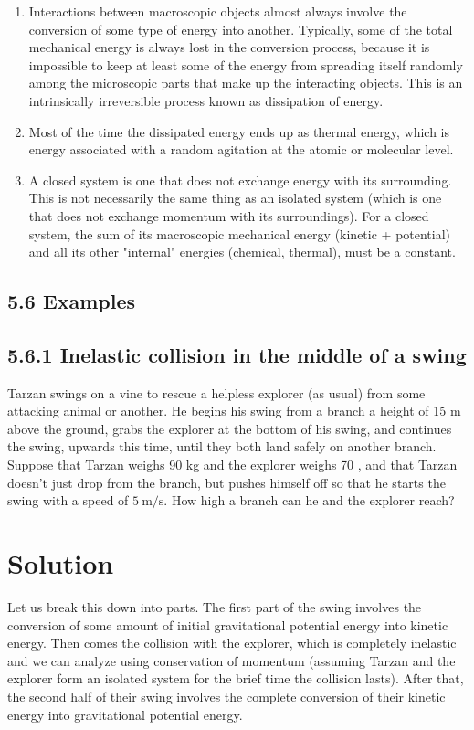 \documentclass[10pt]{article}
\begin{document}
\begin{enumerate}
  \item Interactions between macroscopic objects almost always involve the conversion of some type of energy into another. Typically, some of the total mechanical energy is always lost in the conversion process, because it is impossible to keep at least some of the energy from spreading itself randomly among the microscopic parts that make up the interacting objects. This is an intrinsically irreversible process known as dissipation of energy.
  \item Most of the time the dissipated energy ends up as thermal energy, which is energy associated with a random agitation at the atomic or molecular level.
  \item A closed system is one that does not exchange energy with its surrounding. This is not necessarily the same thing as an isolated system (which is one that does not exchange momentum with its surroundings). For a closed system, the sum of its macroscopic mechanical energy (kinetic + potential) and all its other "internal" energies (chemical, thermal), must be a constant.
\end{enumerate}

\subsection*{5.6 Examples}
\subsection*{5.6.1 Inelastic collision in the middle of a swing}
Tarzan swings on a vine to rescue a helpless explorer (as usual) from some attacking animal or another. He begins his swing from a branch a height of 15 m above the ground, grabs the explorer at the bottom of his swing, and continues the swing, upwards this time, until they both land safely on another branch. Suppose that Tarzan weighs 90 kg and the explorer weighs 70 , and that Tarzan doesn't just drop from the branch, but pushes himself off so that he starts the swing with a speed of $5 \mathrm{~m} / \mathrm{s}$. How high a branch can he and the explorer reach?

\section*{Solution}
Let us break this down into parts. The first part of the swing involves the conversion of some amount of initial gravitational potential energy into kinetic energy. Then comes the collision with the explorer, which is completely inelastic and we can analyze using conservation of momentum (assuming Tarzan and the explorer form an isolated system for the brief time the collision lasts). After that, the second half of their swing involves the complete conversion of their kinetic energy into gravitational potential energy.
\end{document}
